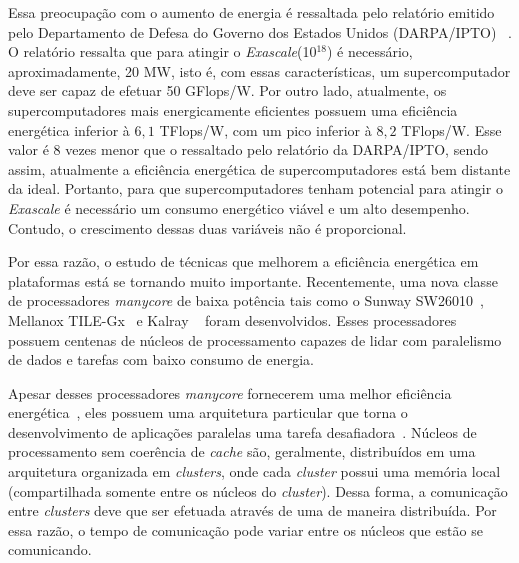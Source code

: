 
Essa preocupação com o aumento de energia é ressaltada pelo relatório emitido
pelo Departamento de Defesa do Governo dos Estados Unidos (DARPA/IPTO)
~\cite{Kogge2008}. O relatório ressalta que para atingir o
\textit{Exascale}(10$^{18}$) é necessário, aproximadamente, 20 MW, isto é, com
essas características, um supercomputador deve ser capaz de efetuar 50 GFlops/W.
Por outro lado, atualmente, os supercomputadores mais energicamente eficientes
possuem uma eficiência energética inferior à $6,1$ TFlops/W, com um pico
inferior à $8,2$ TFlops/W. Esse valor é 8 vezes menor que o ressaltado pelo
relatório da DARPA/IPTO, sendo assim, atualmente a eficiência energética de
supercomputadores está bem distante da ideal. Portanto, para que
supercomputadores tenham potencial para atingir o \textit{Exascale} é necessário
um consumo energético viável e um alto desempenho. Contudo, o crescimento dessas
duas variáveis não é proporcional.


Por essa razão, o estudo de técnicas que melhorem a eficiência energética em
plataformas \hpc está se tornando muito importante.  Recentemente, uma nova
classe de processadores \textit{manycore} de baixa potência tais como o Sunway
SW26010~\cite{sunway:2016}, Mellanox TILE-Gx~\cite{Valero:2012} e Kalray
\mppa~\cite{Castro-IA3:2013} foram desenvolvidos. Esses processadores possuem
centenas de núcleos de processamento capazes de lidar com paralelismo de dados e
tarefas com baixo consumo de energia.

Apesar desses processadores \textit{manycore} fornecerem uma melhor eficiência
energética~\cite{Castro-IA3-JPDC:2014}, eles possuem uma arquitetura particular
que torna o desenvolvimento de aplicações paralelas uma tarefa
desafiadora~\cite{Varghese14,Castro-PARCO:2016,Castro-SBAC-PAD:2014}. Núcleos de
processamento sem coerência de \textit{cache} são, geralmente, distribuídos em
uma arquitetura organizada em \textit{clusters}, onde cada \textit{cluster}
possui uma memória local (compartilhada somente entre os núcleos do
\textit{cluster}). Dessa forma, a comunicação entre \textit{clusters} deve que
ser efetuada através de uma \noc de maneira distribuída.
Por essa razão, o tempo de comunicação pode variar entre os núcleos que estão se
comunicando.

